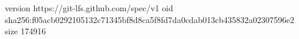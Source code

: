 version https://git-lfs.github.com/spec/v1
oid sha256:f05acb0292105132c71345bf8d8ca5f8fd7da0cdab013cb435832a02307596e2
size 174916
